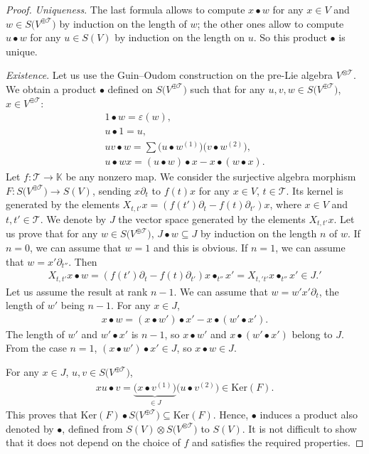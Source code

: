 \documentclass[10pt,a4paper]{amsart}
\numberwithin{equation}{section}
\newcommand{\K}{\mathbb{K}}
\newcommand{\T}{\mathcal{T}}
\renewcommand{\ker}{\mathrm{Ker}}
\begin{document}
\begin{proof} \textit{Uniqueness}. The last formula allows to compute $x\bullet w$ for any $x\in V$
and $w\in S\big(V^{\oplus\T}\big)$ by induction on the length of $w$;
the other ones allow to compute $u\bullet w$ for any $u\in S(V)$ by induction on the length on $u$.
So this product $\bullet$ is unique.

\textit{Existence}. Let us use the Guin--Oudom construction \cite{Guin1,Guin2} on the pre-Lie algebra $V^{\otimes \T}$.
We obtain a product $\bullet$
defined on $S\big(V^{\oplus\T}\big)$ such that for any $u,v,w\in S\big(V^{\oplus\T}\big)$, $x\in V^{\oplus \T}$:
\begin{gather*}
1\bullet w=\varepsilon(w),
\\
u\bullet 1=u,
\\
uv\bullet w=\sum \big(u\bullet w^{(1)}\big)\big(v\bullet w^{(2)}\big),
\\
u\bullet w x=(u\bullet w)\bullet x-x\bullet (w\bullet x).
\end{gather*}
Let $f\colon \T\longrightarrow \K$ be any nonzero map. We consider the surjective algebra morphism
$F\colon S\big(V^{\oplus\T}\big)\allowbreak\longrightarrow S(V)$,
sending $x\partial_t$ to $f(t)x$ for any $x\in V$, $t\in \T$. Its kernel is generated by the elements
$X_{t,t'}x=(f(t')\partial_t-f(t)\partial_{t'})x$,
where $x\in V$ and $t,t'\in \T$. We denote by $J$ the vector space generated by the elements $X_{t,t'}x$.
Let us prove that for any $w\in S\big(V^{\oplus\T}\big)$, $J\bullet w\subseteq J$ by induction on the length $n$ of $w$.
If $n=0$, we can assume that $w=1$ and this is obvious. If $n=1$, we can assume that $w=x'\partial_{t''}$. Then
\begin{gather*}
X_{t,t'}x\bullet w=(f(t')\partial_t-f(t)\partial_{t'}) x\bullet_{t''} x'
=X_{t,'t'}x\bullet_{t''} x' \in J.'
\end{gather*}
Let us assume the result at rank $n-1$. We can assume that $w=w' x'\partial_t$, the length of $w'$ being $n-1$.
For any $x\in J$,
\begin{gather*}
x\bullet w=(x\bullet w')\bullet x'-x\bullet(w'\bullet x').
\end{gather*}
The length of $w'$ and $w'\bullet x'$ is $n-1$, so $x\bullet w'$ and $x\bullet (w'\bullet x')$ belong to $J$.
From the case $n=1$,
$(x\bullet w')\bullet x'\in J$, so $x\bullet w\in J$.

For any $x\in J$, $u,v\in S\big(V^{\oplus\T}\big)$,
\begin{gather*}
xu\bullet v=\underbrace{\big(x\bullet v^{(1)}\big)}_{\in J} \big(u\bullet v^{(2)}\big) \in \ker(F).
\end{gather*}
This proves that $\ker(F)\bullet S\big(V^{\oplus\T}\big)\subseteq \ker(F)$. Hence, $\bullet$ induces a product also denoted by $\bullet$,
defined from $S(V)\otimes S\big(V^{\otimes \T}\big)$ to $S(V)$. It is not difficult to show that it does not depend on the choice of $f$
and satisfies the required properties.
\end{proof}
\end{document}
